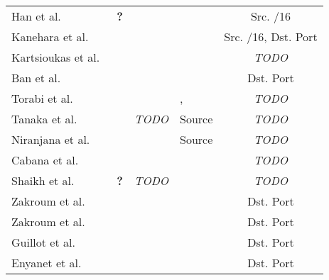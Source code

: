 \documentclass[manuscript,nonacm]{acmart}
\newcommand{\markA}{\ding{66}}%
\newcommand{\markB}{\ding{71}}%
\newcommand{\markC}{\ding{75}}%
\newcommand{\markD}{\ding{168}}%
\newcommand{\markE}{\ding{169}}%
\newcommand{\markF}{\ding{170}}%
\newcommand{\markG}{\ding{171}}%
\newcommand{\markH}{\ding{92}}%
\newcommand{\markJ}{\ding{166}}%
\newcommand{\markX}{\Sagittarius} %
\newcommand{\markY}{\Virgo}
\newcommand{\markZ}{\Moon}
\newcommand{\markEtc}{\textbf{?}}
\begin{document}
\begin{table}[t]
\begin{tabular}{llllc}
        Han et al.~\cite{2020han,2022han} &
        \markX\markEtc &
        \markA &
        \markG &
        Src. /16 \\

        Kanehara et al.~\cite{2019kanehara,2022han} &
        \markX &
        \markA\markH &
        \markG &
        Src. /16, Dst. Port \\


        Kartsioukas et al.~\cite{2023kartsioukas} & 
        \markX\markY & 
        \markA\markH & 
        \markG & 
        \textit{TODO} \\

        Ban et al.~\cite{2016ban} & 
        \markX & 
        \markA & 
        \markF\markG & 
        Dst. Port \\ 

        Torabi et al.~\cite{2020torabi,2018torabi} &
        \markX &
        \markJ &
        \markD,\markE &
        \textit{TODO} \\

        Tanaka et al.~\cite{2023tanaka,2021tanaka} &
        \markX &
        \textit{TODO} &
        Source &
        \textit{TODO} \\

        Niranjana et al.~\cite{2019niranjana} &
        \markX &
        \markA\markB &
        Source &
        \textit{TODO} \\

        Cabana et al.~\cite{2019cabana} &
        \markX &
        \markB\markH &
        \markD\markE &
        \textit{TODO} \\

        Shaikh et al.~\cite{2018shaikh} &
        \markX\markY\markZ\markEtc &
        \textit{TODO} &
        \markE &
        \textit{TODO} \\
  
        Zakroum et al.~\cite{2022zakroum,2018zakroum} &
        \markX &
        \markC\markB &
        \markG &
        Dst. Port \\

        Zakroum et al.~\cite{2023zakroum} &
        \markX &
        \markC\markB &
        \markG &
        Dst. Port \\

        Guillot et al.~\cite{2019guillot} &
        \markZ&
        \markC\markB &
        \markG &
        Dst. Port \\

        Enyanet et al.~\cite{2024enyanet} &
        \markZ &
        \markC\markB &
        \markG &
        Dst. Port \\


\end{tabular}
\end{table}
\end{document}
